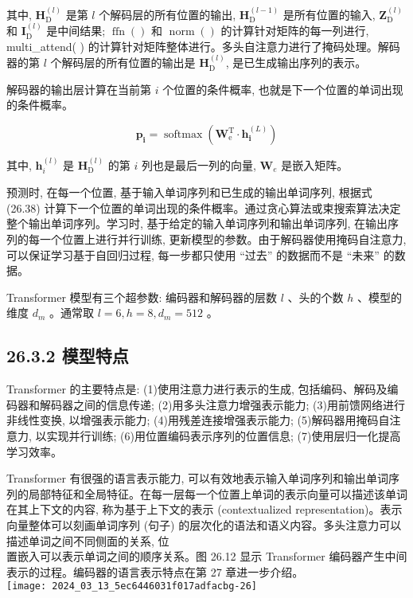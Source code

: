 \documentclass[10pt]{article}
\begin{document}
其中, $\boldsymbol{H}_{\mathrm{D}}^{(l)}$ 是第 $l$ 个解码层的所有位置的输出, $\boldsymbol{H}_{\mathrm{D}}^{(l-1)}$ 是所有位置的输入, $\boldsymbol{Z}_{\mathrm{D}}^{(l)}$ 和 $\boldsymbol{I}_{\mathrm{D}}^{(l)}$ 是中间结果; $\operatorname{ffn}()$ 和 $\operatorname{norm}()$ 的计算针对矩阵的每一列进行, multi\_attend( ) 的计算针对矩阵整体进行。多头自注意力进行了掩码处理。解码器的第 $l$ 个解码层的所有位置的输出是 $\boldsymbol{H}_{\mathrm{D}}^{(l)}$, 是已生成输出序列的表示。

解码器的输出层计算在当前第 $i$ 个位置的条件概率, 也就是下一个位置的单词出现的条件概率。


\begin{equation*}
\boldsymbol{p}_{\boldsymbol{i}}=\operatorname{softmax}\left(\boldsymbol{W}_{\mathrm{e}}^{\mathrm{T}} \cdot \boldsymbol{h}_{\boldsymbol{i}}^{(L)}\right) \tag{26.38}
\end{equation*}


其中, $\boldsymbol{h}_{i}^{(l)}$ 是 $\boldsymbol{H}_{\mathrm{D}}^{(l)}$ 的第 $i$ 列也是最后一列的向量, $\boldsymbol{W}_{e}$ 是嵌入矩阵。

预测时, 在每一个位置, 基于输入单词序列和已生成的输出单词序列, 根据式 (26.38) 计算下一个位置的单词出现的条件概率。通过贪心算法或束搜索算法决定整个输出单词序列。学习时, 基于给定的输入单词序列和输出单词序列, 在输出序列的每一个位置上进行并行训练, 更新模型的参数。由于解码器使用掩码自注意力, 可以保证学习基于自回归过程, 每一步都只使用 “过去” 的数据而不是 “未来” 的数据。

Transformer 模型有三个超参数: 编码器和解码器的层数 $l$ 、头的个数 $h$ 、模型的维度 $d_{m}$ 。通常取 $l=6, h=8, d_{m}=512$ 。

\subsection*{26.3.2 模型特点}
Transformer 的主要特点是: (1)使用注意力进行表示的生成, 包括编码、解码及编码器和解码器之间的信息传递; (2)用多头注意力增强表示能力; (3)用前馈网络进行非线性变换, 以增强表示能力; (4)用残差连接增强表示能力; (5)解码器用掩码自注意力, 以实现并行训练; (6)用位置编码表示序列的位置信息; (7)使用层归一化提高学习效率。

Transformer 有很强的语言表示能力, 可以有效地表示输入单词序列和输出单词序列的局部特征和全局特征。在每一层每一个位置上单词的表示向量可以描述该单词在其上下文的内容, 称为基于上下文的表示 (contextualized representation)。表示向量整体可以刻画单词序列 (句子) 的层次化的语法和语义内容。多头注意力可以描述单词之间不同侧面的关系, 位\\
置嵌入可以表示单词之间的顺序关系。图 26.12 显示 Transformer 编码器产生中间表示的过程。编码器的语言表示特点在第 27 章进一步介绍。\\
\texttt{[image: 2024\_03\_13\_5ec6446031f017adfacbg-26]}
\end{document}
